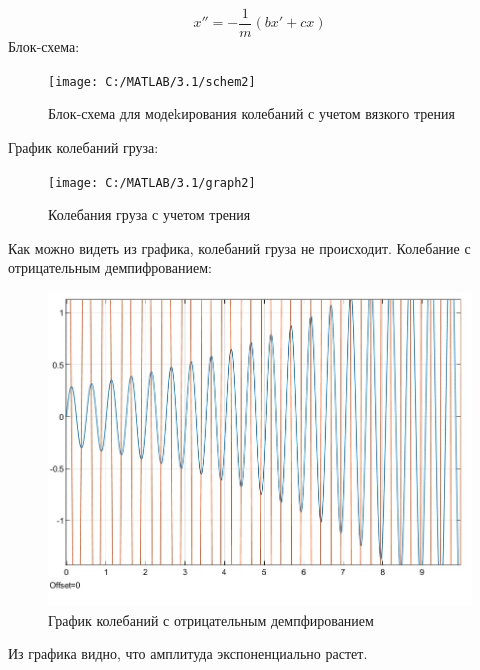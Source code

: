 \documentclass{article}
\begin{document}
	$$x''=-\frac{1}{m}(bx'+cx)$$
	Блок-схема:
	\begin{figure}[H]
		\centering
		\texttt{[image: C:/MATLAB/3.1/schem2]}
		\caption{Блок-схема для модеkирования колебаний с учетом вязкого трения}

	\end{figure}
	График колебаний груза:
	\begin{figure}[H]
		\centering
		\texttt{[image: C:/MATLAB/3.1/graph2]}
		\caption{Колебания груза с учетом трения}

	\end{figure}
	Как можно видеть из графика, колебаний груза не происходит.
	Колебание с отрицательным демпифрованием:
	\begin{figure}[H]
		\centering
		\includegraphics[width=0.7\linewidth]{graph4}
		\caption{График колебаний с отрицательным демпфированием}

	\end{figure}
	Из графика видно, что амплитуда экспоненциально растет.
	
\end{document}
